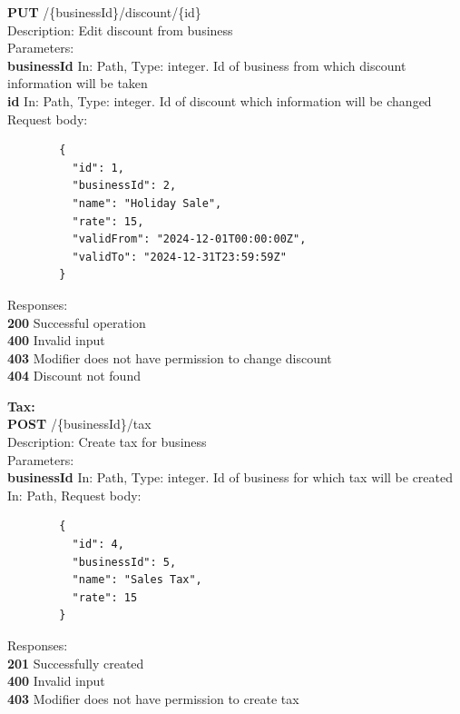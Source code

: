 \documentclass[11pt,a4paper,pdftex]{article}
\begin{document}
\hspace*{1em}\textbf{PUT} /\{businessId\}/discount/\{id\}\\
\hspace*{2em}Description: Edit discount from business\\
\hspace*{2em}Parameters:\\
\hspace*{3em}\textbf{businessId} In: Path, Type: integer. Id of business from which discount information will be taken\\
\hspace*{3em}\textbf{id} In: Path, Type: integer. Id of discount which information will be changed\\
\hspace*{2em}Request body:\\
\begin{verbatim}
        {
          "id": 1,
          "businessId": 2,
          "name": "Holiday Sale",
          "rate": 15,
          "validFrom": "2024-12-01T00:00:00Z",
          "validTo": "2024-12-31T23:59:59Z"
        }
\end{verbatim}
\hspace*{2em}Responses:\\
\hspace*{3em}\textbf{200} Successful operation\\
\hspace*{3em}\textbf{400} Invalid input\\
\hspace*{3em}\textbf{403} Modifier does not have permission to change discount\\
\hspace*{3em}\textbf{404} Discount not found

\textbf{Tax:}\\
\hspace*{1em}\textbf{POST} /\{businessId\}/tax\\
\hspace*{2em}Description: Create tax for business\\
\hspace*{2em}Parameters:\\
\hspace*{3em}\textbf{businessId} In: Path, Type: integer. Id of business for which tax will be created\\ In: Path,
\hspace*{2em}Request body:
\begin{verbatim}
        {
          "id": 4,
          "businessId": 5,
          "name": "Sales Tax",
          "rate": 15
        }
\end{verbatim}
\hspace*{2em}Responses:\\
\hspace*{3em}\textbf{201} Successfully created\\
\hspace*{3em}\textbf{400} Invalid input\\
\hspace*{3em}\textbf{403} Modifier does not have permission to create tax
\end{document}
